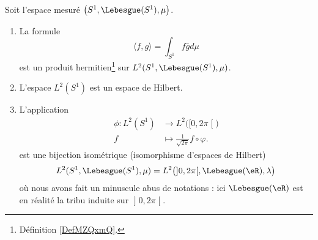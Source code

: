 \begin{proposition}     \label{PROPooDJERooYirMru}
	Soit l'espace mesuré \( \big( S^1,\Lebesgue(S^1), \mu \big)\).
	\begin{enumerate}
		\item
		      La formule
		      \begin{equation}        \label{EQooHPFQooEaujfZ}
			      \langle f, g\rangle =\int_{S^1}f\bar gd\mu
		      \end{equation}
		      est un produit hermitien\footnote{Définition \ref{DefMZQxmQ}.} sur \( L^2(S^1,\Lebesgue(S^1),\mu)\).
		\item
		      L'espace \( L^2(S^1)\) est un espace de Hilbert.
		\item       \label{ITEMooQZAPooKEeQBW}
		      L'application
		      \begin{equation}
			      \begin{aligned}
				      \phi\colon L^2(S^1) & \to L^2\big( \mathopen[ 0 , 2\pi \mathclose[ \big) \\
				      f                   & \mapsto \frac{1}{ \sqrt{ 2\pi } }f\circ \varphi.
			      \end{aligned}
		      \end{equation}
		      est une bijection isométrique (isomorphisme d'espaces de Hilbert)
		      \begin{equation}
			      L^2(S^1,\Lebesgue(S^1),\mu)=L^2\big( \mathopen] 0  , 2\pi \mathclose[,\Lebesgue(\eR),\lambda \big)
		      \end{equation}
		      où nous avons fait un minuscule abus de notations : ici \( \Lebesgue(\eR)\) est en réalité la tribu induite sur \( \mathopen] 0 , 2\pi \mathclose[\).
	\end{enumerate}
\end{proposition}


